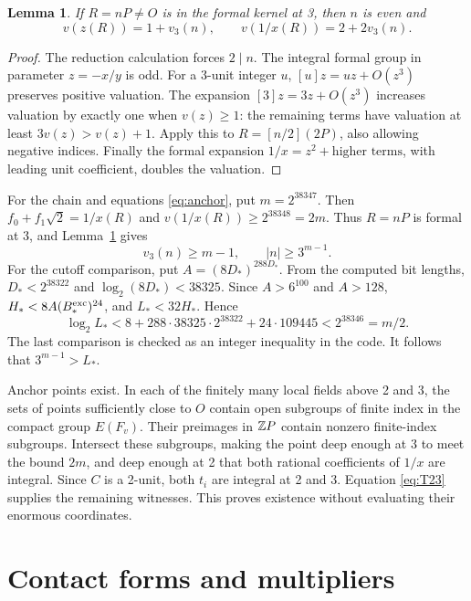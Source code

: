 \documentclass[11pt]{article}
\newtheorem{lemma}[theorem]{Lemma}
\theoremstyle{definition}
\begin{document}
\begin{lemma}\label{lem:anchor-index}
If \(R=nP\ne O\) is in the formal kernel at 3, then \(n\)
is even and
\[
             v(z(R))=1+v_3(n),\qquad v(1/x(R))=2+2v_3(n).
\]
\end{lemma}
\begin{proof}
The reduction calculation forces \(2\mid n\). The integral
formal group in parameter \(z=-x/y\) is odd. For a 3-unit
integer \(u\), \([u]z=uz+O(z^3)\) preserves positive
valuation. The expansion \([3]z=3z+O(z^3)\) increases valuation
by exactly one when \(v(z)\ge1\): the remaining terms have
valuation at least \(3v(z)>v(z)+1\). Apply this to
\(R=[n/2](2P)\), also allowing negative indices. Finally the
formal expansion \(1/x=z^2+\text{higher terms}\), with leading
unit coefficient, doubles the valuation.
\end{proof}

For the chain and equations \eqref{eq:anchor}, put
\(m=2^{38347}\). Then \(f_0+f_1\sqrt2=1/x(R)\) and
\(v(1/x(R))\ge2^{38348}=2m\). Thus \(R=nP\) is formal at
3, and Lemma~\ref{lem:anchor-index} gives
\begin{equation}\label{eq:anchor-large}
                       v_3(n)\ge m-1,\qquad |n|\ge3^{m-1}.
\end{equation}
For the cutoff comparison, put \(A=(8D_*)^{288D_*}\). From the
computed bit lengths, \(D_*<2^{38322}\) and
\(\log_2(8D_*)<38325\). Since \(A>6^{100}\) and \(A>128\),
\(H_*<8A(B_*^{\rm exc})^{24}\), and \(L_*<32H_*\). Hence
\begin{equation}\label{eq:anchor-cutoff}
 \log_2L_*<8+288\cdot38325\cdot2^{38322}+24\cdot109445
             <2^{38346}=m/2.
\end{equation}
The last comparison is checked as an integer inequality in the code.
It follows that \(3^{m-1}>L_*\).

Anchor points exist. In each of the finitely many local fields above
2 and 3, the sets of points sufficiently close to \(O\) contain
open subgroups of finite index in the compact group \(E(F_v)\).
Their preimages in \(\mathbb Z P\) contain nonzero finite-index
subgroups. Intersect these subgroups, making the point deep enough
at 3 to meet the bound \(2m\), and deep enough at 2 that both
rational coefficients of \(1/x\) are integral. Since \(C\)
is a 2-unit, both \(t_i\) are integral at 2 and 3. Equation
\eqref{eq:T23} supplies the remaining witnesses. This proves
existence without evaluating their enormous coordinates.

\section{Contact forms and multipliers}\label{sec:contacts}
\end{document}
